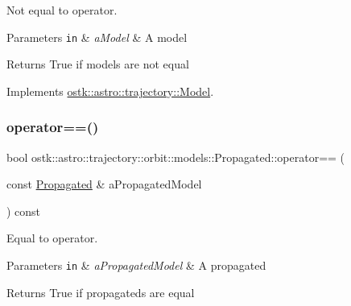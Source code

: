 Not equal to operator. 


\begin{DoxyParams}[1]{Parameters}
\mbox{\tt in}  & {\em a\+Model} & A model \\
\hline
\end{DoxyParams}
\begin{DoxyReturn}{Returns}
True if models are not equal 
\end{DoxyReturn}


Implements \hyperlink{classostk_1_1astro_1_1trajectory_1_1_model_a2dd77b9f6939d738f3a489f26c955340}{ostk\+::astro\+::trajectory\+::\+Model}.

\mbox{\label{classostk_1_1astro_1_1trajectory_1_1orbit_1_1models_1_1_propagated_a88777b83d939ca894a20af525db347b8}} 
\subsubsection{\texorpdfstring{operator==()}{operator==()}\hspace{0.1cm}{\footnotesize\ttfamily [1/2]}}
{\footnotesize\ttfamily bool ostk\+::astro\+::trajectory\+::orbit\+::models\+::\+Propagated\+::operator== (\begin{DoxyParamCaption}\item[{const \hyperlink{classostk_1_1astro_1_1trajectory_1_1orbit_1_1models_1_1_propagated}{Propagated} \&}]{a\+Propagated\+Model }\end{DoxyParamCaption}) const}



Equal to operator. 


\begin{DoxyParams}[1]{Parameters}
\mbox{\tt in}  & {\em a\+Propagated\+Model} & A propagated \\
\hline
\end{DoxyParams}
\begin{DoxyReturn}{Returns}
True if propagateds are equal 
\end{DoxyReturn}
\mbox{\label{classostk_1_1astro_1_1trajectory_1_1orbit_1_1models_1_1_propagated_a29b52ccf653fbd84699edab0f198f590}} 
